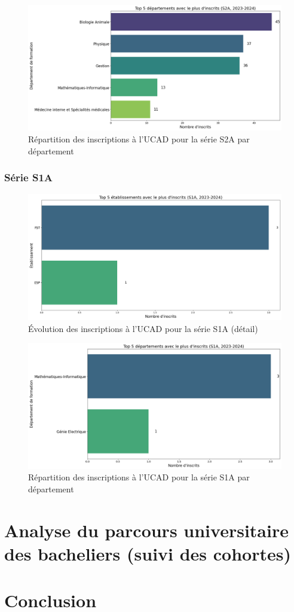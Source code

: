 \begin{figure}[h]
\centering
\caption{Répartition des inscriptions à l'UCAD pour la série S2A par département}
\includegraphics[width=1\textwidth]{figure/dep_S2A_2024.png}
\end{figure}

\newpage
\subsubsection{Série S1A}
\begin{figure}[h]
\centering
\caption{Évolution des inscriptions à l'UCAD pour la série S1A (détail)}
\includegraphics[width=1\textwidth]{figure/etab_S1A_2024.png}
\end{figure}

\begin{figure}[h]
\centering
\caption{Répartition des inscriptions à l'UCAD pour la série S1A par département}
\includegraphics[width=1\textwidth]{figure/dep_S1A_2024.png}
\end{figure}

\newpage
\section{Analyse du parcours universitaire des bacheliers (suivi des cohortes)}

\section{Conclusion}